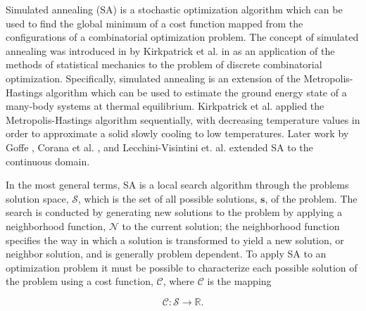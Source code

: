 \documentclass[11pt]{afthesis}
\begin{document}
	
	
	Simulated annealing (SA) is a stochastic optimization algorithm which can be used to find the global minimum of a cost function mapped from the configurations of a combinatorial optimization problem. The concept of simulated annealing was introduced in by Kirkpatrick et al. in \cite{kirkpatrick1983} as an application of the methods of statistical mechanics to the problem of discrete combinatorial optimization. Specifically, simulated annealing is an extension of the Metropolis-Hastings \cite{metropolis1953} algorithm which can be used to estimate the ground energy state of a many-body systems at thermal equilibrium. Kirkpatrick et al. applied the Metropolis-Hastings algorithm sequentially, with decreasing temperature values in order to approximate a solid slowly cooling to low temperatures. Later work by Goffe \cite{goffe1994globaloptimization}, Corana et al. \cite{corana1987minimizingmultimodal}, and Lecchini-Visintini et. al. \cite{lecchinivisintini2007sacontinuousgaruntees} extended SA to the continuous domain.
	
	In the most general terms, SA is a local search algorithm through the problems solution space, \begin{math} \boldsymbol{\mathcal{S}} \end{math}, which is the set of all possible solutions, \begin{math}\boldsymbol{s}  \end{math}, of the problem. The search is conducted by generating new solutions to the problem by applying a neighborhood function, \begin{math}\boldsymbol{\mathcal{N}} \end{math} to the current solution; the neighborhood function specifies the way in which a solution is transformed to yield a new solution, or neighbor solution, and is generally problem dependent. To apply SA to an optimization problem it must be possible to characterize each possible solution of the problem using a cost function, \begin{math}\mathcal{C} \end{math}, where \begin{math}\mathcal{C} \end{math} is the mapping
	
	\begin{equation*} \label{eq:cost_mapping}
	\mathcal{C} : \boldsymbol{\mathcal{S}} \rightarrow \mathbb{R}.
	\end{equation*}
	
\end{document}
